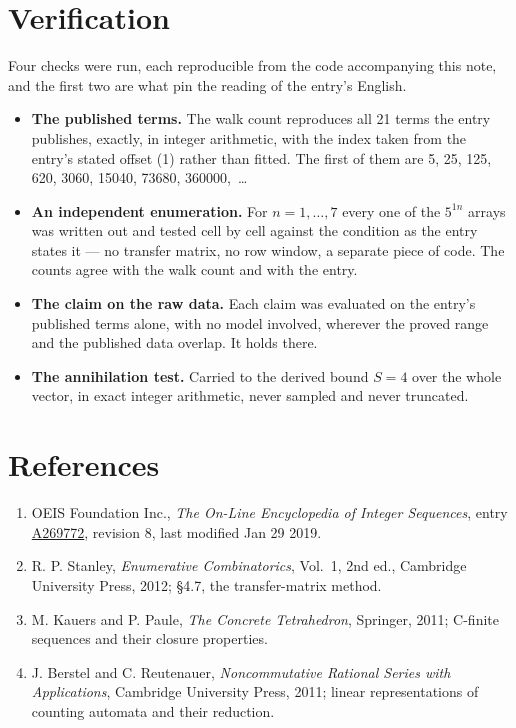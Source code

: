 \documentclass[11pt]{article}
\theoremstyle{definition}
\begin{document}
\section{Verification}

Four checks were run, each reproducible from the code accompanying this note, and the first two are what pin the reading of the entry's English.

\begin{itemize}

\item {\bfseries The published terms.} The walk count reproduces all 21 terms the entry publishes, exactly, in integer arithmetic, with the index taken from the entry's stated offset (1) rather than fitted. The first of them are 5, 25, 125, 620, 3060, 15040, 73680, 360000,~\dots

\item {\bfseries An independent enumeration.} For $n = 1,\dots,7$ every one of the $5^{1n}$ arrays was written out and tested cell by cell against the condition as the entry states it --- no transfer matrix, no row window, a separate piece of code. The counts agree with the walk count and with the entry.

\item {\bfseries The claim on the raw data.} Each claim was evaluated on the entry's published terms alone, with no model involved, wherever the proved range and the published data overlap. It holds there.

\item {\bfseries The annihilation test.} Carried to the derived bound $S = 4$ over the whole vector, in exact integer arithmetic, never sampled and never truncated.

\end{itemize}

\section{References}

\begin{enumerate}

\item OEIS Foundation Inc., \emph{The On-Line Encyclopedia of Integer Sequences}, entry \href{https://oeis.org/A269772}{A269772}, revision 8, last modified Jan 29 2019.

\item R. P. Stanley, \emph{Enumerative Combinatorics}, Vol.~1, 2nd ed., Cambridge University Press, 2012; \S4.7, the transfer-matrix method.

\item M. Kauers and P. Paule, \emph{The Concrete Tetrahedron}, Springer, 2011; C-finite sequences and their closure properties.

\item J. Berstel and C. Reutenauer, \emph{Noncommutative Rational Series with Applications}, Cambridge University Press, 2011; linear representations of counting automata and their reduction.

\end{enumerate}
\end{document}

